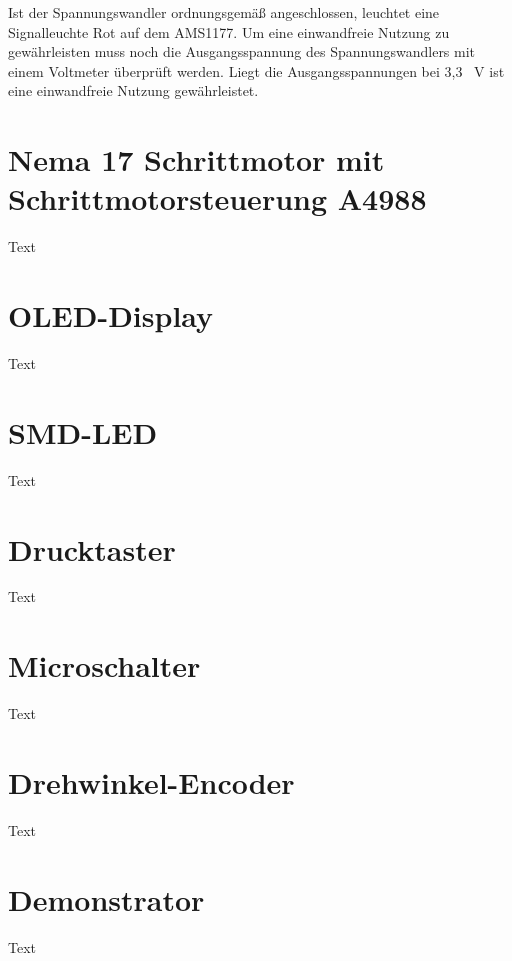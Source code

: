 Ist der Spannungswandler ordnungsgemäß angeschlossen, leuchtet eine Signalleuchte Rot auf dem AMS1177. Um eine einwandfreie Nutzung zu gewährleisten muss noch die Ausgangsspannung des Spannungswandlers mit einem Voltmeter überprüft werden. Liegt die Ausgangsspannungen bei 3,3 \ V ist eine einwandfreie Nutzung gewährleistet. 


\section{ Nema 17 Schrittmotor mit Schrittmotorsteuerung A4988 }

Text

%
%

\section{OLED-Display}

Text

%
%

\section{SMD-LED}

Text

%
%

\section{Drucktaster}

Text

%
%

\section{Microschalter}

Text

%
%

\section{Drehwinkel-Encoder}

Text

%
%

\section{Demonstrator}

Text

%
%
